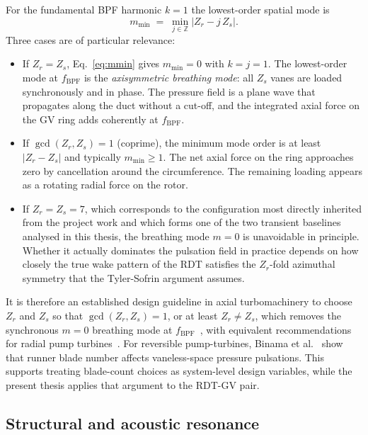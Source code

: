 For the fundamental BPF harmonic $k=1$ the lowest-order spatial mode is
\begin{equation}
    m_{\min} \;=\; \min_{j\in\mathbb{Z}} \bigl| Z_r - j\,Z_s \bigr|.
    \label{eq:mmin}
\end{equation}
Three cases are of particular relevance:
\begin{itemize}
  \item If $Z_r = Z_s$, Eq.~\eqref{eq:mmin} gives $m_{\min}=0$ with $k=j=1$. The lowest-order mode at $f_{\mathrm{BPF}}$ is the \emph{axisymmetric breathing mode}: all $Z_s$ vanes are loaded synchronously and in phase. The pressure field is a plane wave that propagates along the duct without a cut-off, and the integrated axial force on the GV ring adds coherently at $f_{\mathrm{BPF}}$.
  \item If $\gcd(Z_r,Z_s)=1$ (coprime), the minimum mode order is at least $|Z_r - Z_s|$ and typically $m_{\min} \geq 1$. The net axial force on the ring approaches zero by cancellation around the circumference. The remaining loading appears as a rotating radial force on the rotor.
  \item If $Z_r = Z_s = 7$, which corresponds to the configuration most directly inherited from the project work and which forms one of the two transient baselines analysed in this thesis, the breathing mode $m=0$ is unavoidable in principle. Whether it actually dominates the pulsation field in practice depends on how closely the true wake pattern of the RDT satisfies the $Z_r$-fold azimuthal symmetry that the Tyler-Sofrin argument assumes.
\end{itemize}
It is therefore an established design guideline in axial turbomachinery to choose $Z_r$ and $Z_s$ so that $\gcd(Z_r,Z_s)=1$, or at least $Z_r \neq Z_s$, which removes the synchronous $m=0$ breathing mode at $f_{\mathrm{BPF}}$~\cite{Tyler1962,Brekke2001}, with equivalent recommendations for radial pump turbines~\cite{Tanaka2011}. For reversible pump-turbines, Binama et al.~\cite{Binama2021FlowInstability} show that runner blade number affects vaneless-space pressure pulsations. This supports treating blade-count choices as system-level design variables, while the present thesis applies that argument to the RDT-GV pair.
 
\subsection{Structural and acoustic resonance}
\label{sec:rsi-resonance}

